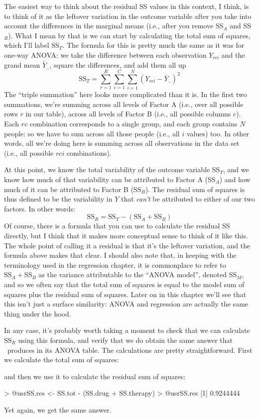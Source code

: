 The easiest way to think about the residual SS values in this context, I think, is to think of it as the leftover variation in the outcome variable after you take into account the differences in the marginal means (i.e., after you remove SS$_A$ and SS$_B$). What I mean by that is we can start by calculating the total sum of squares, which I'll label SS$_T$. The formula for this is pretty much the same as it was for one-way ANOVA: we take the difference between each observation $Y_{rci}$ and the grand mean $\bar{Y}_{..}$, square the differences, and add them all up
$$
\mbox{SS}_T = \sum_{r=1}^R \sum_{c=1}^C \sum_{i=1}^N \left( Y_{rci} - \bar{Y}_{..}\right)^2
$$
The ``triple summation'' here looks more complicated than it is. In the first two summations, we're summing across all levels of Factor A (i.e., over all possible rows $r$ in our table), across all levels of Factor B (i.e., all possible columns $c$). Each $rc$ combination corresponds to a single group, and each group contains $N$ people: so we have to sum across all those people (i.e., all $i$ values) too. In other words, all we're doing here is summing across all observations in the data set (i.e., all possible $rci$ combinations). 

At this point, we know the total variability of the outcome variable SS$_T$, and we know how much of that variability can be attributed to Factor A (SS$_A$) and how much of it can be attributed to Factor B (SS$_B$). The residual sum of squares is thus defined to be the variability in $Y$ that {\it can't} be attributed to either of our two factors. In other words:
$$
\mbox{SS}_R = \mbox{SS}_T - (\mbox{SS}_A + \mbox{SS}_B)
$$
Of course, there is a formula that you can use to calculate the residual SS directly, but I think that it makes more conceptual sense to think of it like this. The whole point of calling it a residual is that it's the leftover variation, and the formula above makes that clear. I should also note that, in keeping with the terminology used in the regression chapter, it is commonplace to refer to $\mbox{SS}_A + \mbox{SS}_B$ as the variance attributable to the ``ANOVA model'', denoted SS$_M$, and so we often say that the total sum of squares is equal to the model sum of squares plus the residual sum of squares. Later on in this chapter we'll see that this isn't just a surface similarity: ANOVA and regression are actually the same thing under the hood. 

In any case, it's probably worth taking a moment to check that we can calculate SS$_R$ using this formula, and verify that we do obtain the same answer that \R\ produces in its ANOVA table. The calculations are pretty straightforward. First we calculate the total sum of squares:
and then we use it to calculate the residual sum of squares:
\begin{rblock1}
> @usr{SS.res <- SS.tot - (SS.drug + SS.therapy)}
> @usr{SS.res}
[1] 0.9244444
\end{rblock1}
Yet again, we get the same answer. 

